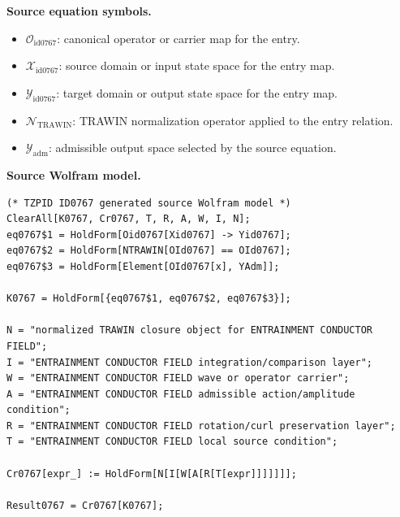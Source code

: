 \begin{minipage}[t]{0.49\linewidth}
\begingroup
\small
\raggedright
\textbf{Source equation symbols.}\par
\begin{itemize}[leftmargin=1.35em,itemsep=1pt,topsep=1pt,parsep=0pt]
    \item $\mathcal{O}_{\mathrm{id0767}}$: canonical operator or carrier map for the entry.
    \item $\mathcal{X}_{\mathrm{id0767}}$: source domain or input state space for the entry map.
    \item $\mathcal{Y}_{\mathrm{id0767}}$: target domain or output state space for the entry map.
    \item $\mathcal{N}_{\mathrm{TRAWIN}}$: TRAWIN normalization operator applied to the entry relation.
    \item $\mathcal{Y}_{\mathrm{adm}}$: admissible output space selected by the source equation.
\end{itemize}
\endgroup
\end{minipage}\hfill
\begin{minipage}[t]{0.47\linewidth}
\begingroup
\scriptsize
\raggedright
\textbf{Source Wolfram model.}\par
\begin{Verbatim}[fontsize=\tiny,breaklines=true,breakanywhere=true]
(* TZPID ID0767 generated source Wolfram model *)
ClearAll[K0767, Cr0767, T, R, A, W, I, N];
eq0767$1 = HoldForm[Oid0767[Xid0767] -> Yid0767];
eq0767$2 = HoldForm[NTRAWIN[OId0767] == OId0767];
eq0767$3 = HoldForm[Element[OId0767[x], YAdm]];

K0767 = HoldForm[{eq0767$1, eq0767$2, eq0767$3}];

N = "normalized TRAWIN closure object for ENTRAINMENT CONDUCTOR FIELD";
I = "ENTRAINMENT CONDUCTOR FIELD integration/comparison layer";
W = "ENTRAINMENT CONDUCTOR FIELD wave or operator carrier";
A = "ENTRAINMENT CONDUCTOR FIELD admissible action/amplitude condition";
R = "ENTRAINMENT CONDUCTOR FIELD rotation/curl preservation layer";
T = "ENTRAINMENT CONDUCTOR FIELD local source condition";

Cr0767[expr_] := HoldForm[N[I[W[A[R[T[expr]]]]]]];

Result0767 = Cr0767[K0767];
\end{Verbatim}
\endgroup
\end{minipage}

